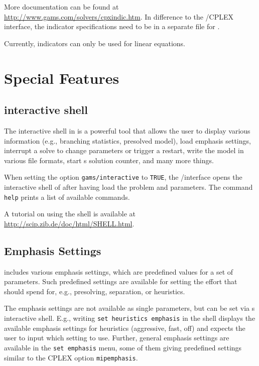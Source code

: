 More documentation can be found at \url{http://www.gams.com/solvers/cpxindic.htm}.
In difference to the \GAMS/CPLEX interface, the indicator specifications need to be in a separate file for \SCIP.

Currently, indicators can only be used for linear equations.

\section{Special Features}

\subsection{\SCIP interactive shell}

The interactive shell in \SCIP is a powerful tool that allows the user to display various information (e.g., branching statistics, presolved model), load emphasis settings, interrupt a solve to change parameters or trigger a restart, write the model in various file formats, start {\SCIP}s solution counter, and many more things.

When setting the option \texttt{gams/interactive} to \texttt{TRUE}, the \GAMS/\SCIP interface opens the interactive shell of \SCIP after having load the \GAMS problem and parameters.
The command \texttt{help} prints a list of available commands.

A tutorial on using the \SCIP shell is available at \url{http://scip.zib.de/doc/html/SHELL.html}.

\subsection{Emphasis Settings}

\SCIP includes various emphasis settings, which are predefined values for a set of \SCIP parameters.
Such predefined settings are available for setting the effort that \SCIP should spend for, e.g., presolving, separation, or heuristics.

The emphasis settings are not available as single parameters, but can be set via {\SCIP}s interactive shell.
E.g., writing \texttt{set heuristics emphasis} in the shell displays the available emphasis settings for heuristics (aggressive, fast, off) and expects the user to input which setting to use.
Further, general emphasis settings are available in the \texttt{set emphasis} menu, some of them giving predefined settings similar to the CPLEX option \texttt{mipemphasis}.

